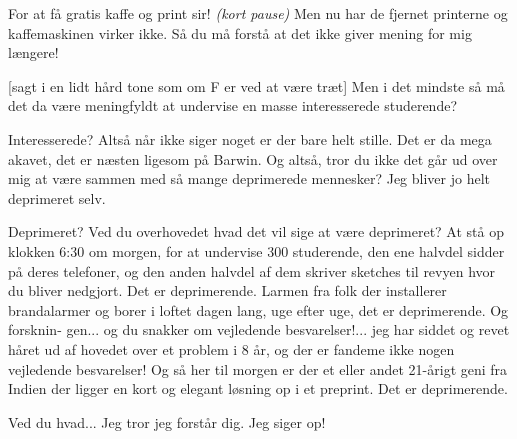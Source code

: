 \documentclass[a4paper,11pt]{article}
\begin{document}
\begin{sketch}

For at få gratis kaffe og print sir! \emph{(kort pause)} Men nu har de fjernet printerne og kaffemaskinen virker ikke. Så du må forstå at det ikke giver mening for mig længere!

[sagt i en lidt hård tone som om F er ved at være træt] Men i det mindste så må det da være meningfyldt at undervise en masse interesserede studerende?

 Interesserede? Altså når ikke siger noget er der bare helt stille. Det er da mega akavet, det er næsten ligesom på Barwin. Og altså, tror du ikke det går ud over mig at være sammen med så mange deprimerede mennesker? Jeg bliver jo helt deprimeret selv.


 Deprimeret? Ved du overhovedet hvad det vil sige at være deprimeret?
At stå op klokken 6:30 om morgen, for at undervise 300 studerende, den ene halvdel sidder på deres telefoner, og den anden halvdel af dem skriver sketches til revyen hvor du bliver nedgjort. Det er deprimerende. Larmen fra folk der installerer brandalarmer og borer i loftet dagen lang, uge efter uge, det er deprimerende. Og forsknin-
gen... og du snakker om vejledende besvarelser!... jeg har siddet og revet håret ud af hovedet over et problem i 8 år, og der er fandeme ikke nogen vejledende besvarelser! Og så her til morgen er der et eller andet 21-årigt geni fra Indien der ligger en kort og elegant løsning op i et preprint. Det er deprimerende.


 Ved du hvad... Jeg tror jeg forstår dig. Jeg siger op!


\end{sketch}
\end{document}

